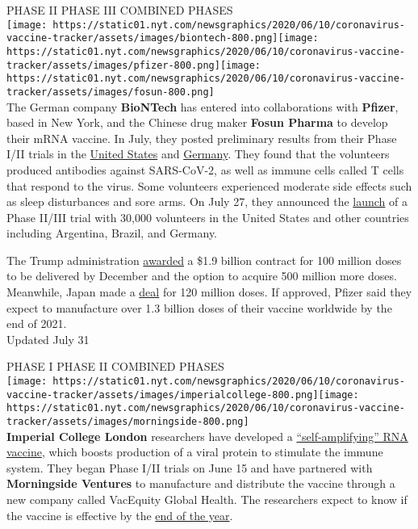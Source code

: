 PHASE II PHASE III COMBINED PHASES\\
\texttt{[image: https://static01.nyt.com/newsgraphics/2020/06/10/coronavirus-vaccine-tracker/assets/images/biontech-800.png]}\texttt{[image: https://static01.nyt.com/newsgraphics/2020/06/10/coronavirus-vaccine-tracker/assets/images/pfizer-800.png]}\texttt{[image: https://static01.nyt.com/newsgraphics/2020/06/10/coronavirus-vaccine-tracker/assets/images/fosun-800.png]}\\
The German company \textbf{BioNTech} has entered into collaborations
with \textbf{Pfizer}, based in New York, and the Chinese drug maker
\textbf{Fosun Pharma} to develop their mRNA vaccine. In July, they
posted preliminary results from their Phase I/II trials in the
\href{https://www.medrxiv.org/content/10.1101/2020.06.30.20142570v1}{United
States} and
\href{https://www.medrxiv.org/content/10.1101/2020.07.17.20140533v1}{Germany}.
They found that the volunteers produced antibodies against SARS-CoV-2,
as well as immune cells called T cells that respond to the virus. Some
volunteers experienced moderate side effects such as sleep disturbances
and sore arms. On July 27, they announced the
\href{https://www.businesswire.com/news/home/20200727005800/en/Pfizer-BioNTech-Choose-Lead-mRNA-Vaccine-Candidate}{launch}
of a Phase II/III trial with 30,000 volunteers in the United States and
other countries including Argentina, Brazil, and Germany.

The Trump administration
\href{https://www.nytimes.com/2020/07/22/us/politics/pfizer-coronavirus-vaccine.html}{awarded}
a \$1.9 billion contract for 100 million doses to be delivered by
December and the option to acquire 500 million more doses. Meanwhile,
Japan made a
\href{https://www.pfizer.com/news/press-release/press-release-detail/pfizer-and-biontech-supply-japan-120-million-doses-their}{deal}
for 120 million doses. If approved, Pfizer said they expect to
manufacture over 1.3 billion doses of their vaccine worldwide by the end
of 2021.\\
Updated July 31

PHASE I PHASE II COMBINED PHASES\\
\texttt{[image: https://static01.nyt.com/newsgraphics/2020/06/10/coronavirus-vaccine-tracker/assets/images/imperialcollege-800.png]}\texttt{[image: https://static01.nyt.com/newsgraphics/2020/06/10/coronavirus-vaccine-tracker/assets/images/morningside-800.png]}\\
\textbf{Imperial College London} researchers have developed a
\href{https://www.nytimes.com/2020/06/07/world/europe/imperial-college-uk-vaccine-coronavirus.html}{``self-amplifying''
RNA vaccine}, which boosts production of a viral protein to stimulate
the immune system. They began Phase I/II trials on June 15 and have
partnered with \textbf{Morningside Ventures} to manufacture and
distribute the vaccine through a new company called VacEquity Global
Health. The researchers expect to know if the vaccine is effective by
the
\href{https://www.theguardian.com/society/2020/jul/03/im-cautiously-optimistic-imperials-robin-shattock-on-his-coronavirus-vaccine}{end
of the year}.

